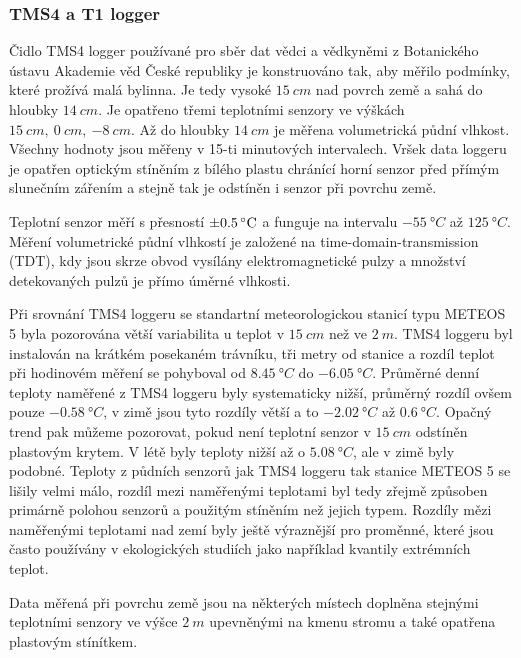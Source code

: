\subsubsection{TMS4 a T1 logger} \label{chap:loggers}
Čidlo TMS4 logger používané pro sběr dat vědci a vědkyněmi z Botanického ústavu Akademie věd České republiky je konstruováno tak, aby měřilo podmínky, které prožívá malá bylinna. Je tedy vysoké $\SI{15}{cm}$ nad povrch země a sahá do hloubky $\SI{14}{cm}$. Je opatřeno třemi teplotními senzory ve výškách $\SI{15}{cm},\ \SI{0}{cm},\ \SI{-8}{cm}$. Až do hloubky $\SI{14}{cm}$ je měřena volumetrická půdní vlhkost. Všechny hodnoty jsou měřeny v 15-ti minutových intervalech. Vršek data loggeru je opatřen optickým stíněním z bílého plastu chránící horní senzor před přímým slunečním zářením a stejně tak je odstíněn i senzor při povrchu země. 

Teplotní senzor měří s přesností $\SI{\pm 0.5}{\degree C}$ a funguje na intervalu $\SI{-55}{\degree C}$ až $\SI{125}{\degree C}$. Měření volumetrické půdní vlhkostí je založené na time-domain-transmission (TDT), kdy jsou skrze obvod vysílány elektromagnetické pulzy a množství detekovaných pulzů je přímo úměrné vlhkosti. 

Při srovnání TMS4 loggeru se standartní meteorologickou stanicí typu METEOS 5 byla pozorována větší variabilita u teplot v $\SI{15}{cm}$ než ve $\SI{2}{m}$. TMS4 loggeru byl instalován na krátkém posekaném trávníku, tři metry od stanice a rozdíl teplot při hodinovém měření se pohyboval od $\SI{+8.45}{\degree C}$ do $\SI{-6.05}{\degree C}$. Průměrné denní teploty naměřené z TMS4 loggeru byly systematicky nižší, průměrný rozdíl ovšem pouze $\SI{-0.58}{\degree C}$, v zimě jsou tyto rozdíly větší a to $\SI{-2.02}{\degree C}$ až $\SI{0.6}{\degree C}$. Opačný trend pak můžeme pozorovat, pokud není teplotní senzor v $\SI{15}{cm}$ odstíněn plastovým krytem. V létě byly teploty nižší až o $\SI{5.08}{\degree C}$, ale v zimě byly podobné. Teploty z půdních senzorů jak TMS4 loggeru tak stanice METEOS 5 se lišily velmi málo, rozdíl mezi naměřenými teplotami byl tedy zřejmě způsoben primárně polohou senzorů a použitým stíněním než jejich typem. Rozdíly mězi naměřenými teplotami nad zemí byly ještě výraznější pro proměnné, které jsou často používány v ekologických studiích jako například kvantily extrémních teplot\cite{WildJan2019Caer}. 

Data měřená při povrchu země jsou na některých místech doplněna stejnými teplotními senzory ve výšce $\SI{2}{m}$ upevněnými na kmenu stromu a také opatřena plastovým stínítkem.


